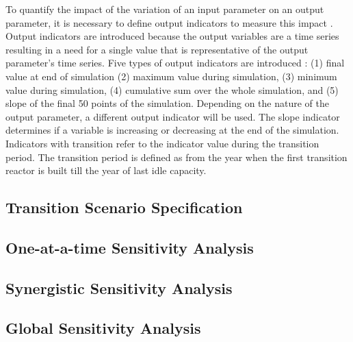 To quantify the impact of the variation of an input parameter 
on an output parameter, it is necessary to define output indicators 
to measure this impact \cite{noauthor_effects_2017}. 
Output indicators are introduced because the output variables
are a time series resulting in a need for a single value that 
is representative of the output parameter's time series.  
Five types of output indicators are introduced 
\cite{noauthor_effects_2017}: 
(1) final value at end of simulation
(2) maximum value during simulation, 
(3) minimum value during simulation, 
(4) cumulative sum over the whole simulation, and 
(5) slope of the final 50 points of the simulation.
Depending on the nature of the output parameter, a different 
output indicator will be used. 
The slope indicator determines if a variable is increasing or 
decreasing at the end of the simulation. 
Indicators with transition refer to the indicator value during the 
transition period. 
The transition period is defined as from the year when the first 
transition reactor is built till the year of last idle capacity. 

\subsection{Transition Scenario Specification}

\subsection{One-at-a-time Sensitivity Analysis}

\subsection{Synergistic Sensitivity Analysis}

\subsection{Global Sensitivity Analysis}